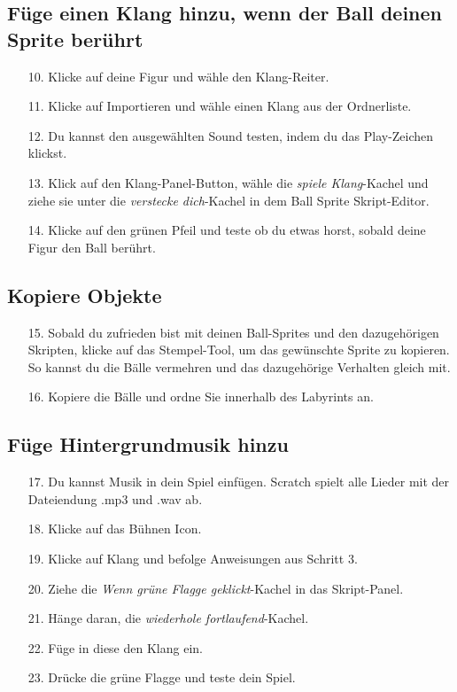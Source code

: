 \subsection{Füge einen Klang hinzu, wenn der Ball deinen Sprite berührt}
\begin{itemize}
\item[10.] Klicke auf deine Figur und wähle den Klang-Reiter.
\item[11.] Klicke auf Importieren und wähle einen Klang aus der Ordnerliste.
\item[12.] Du kannst den ausgewählten Sound testen, indem du das Play-Zeichen klickst.
\item[13.] Klick auf den Klang-Panel-Button, wähle die \textit{spiele Klang}-Kachel und ziehe sie unter die \textit{verstecke dich}-Kachel in dem Ball Sprite Skript-Editor.
\item[14.] Klicke auf den grünen Pfeil und teste ob du etwas horst, sobald deine Figur den Ball berührt.
\end{itemize}


\subsection{Kopiere Objekte}
\begin{itemize}
\item[15.] Sobald du zufrieden bist mit deinen Ball-Sprites und den dazugehörigen Skripten, klicke auf das Stempel-Tool, um das gewünschte Sprite zu kopieren. So kannst du die Bälle vermehren und das dazugehörige Verhalten gleich mit.
\item[16.] Kopiere die Bälle und ordne Sie innerhalb des Labyrints an.
\end{itemize}


\subsection{Füge Hintergrundmusik hinzu}
\begin{itemize}
\item[17.] Du kannst Musik in dein Spiel einfügen. Scratch spielt alle Lieder mit der Dateiendung .mp3 und .wav ab.
\item[18.] Klicke auf das Bühnen Icon.
\item[19.] Klicke auf Klang und befolge Anweisungen aus Schritt 3.
\item[20.] Ziehe die \textit{Wenn grüne Flagge geklickt}-Kachel in das Skript-Panel.
\item[21.] Hänge daran, die \textit{wiederhole fortlaufend}-Kachel.
\item[22.] Füge in diese den Klang ein.
\item[23.] Drücke die grüne Flagge und teste dein Spiel.
\end{itemize}